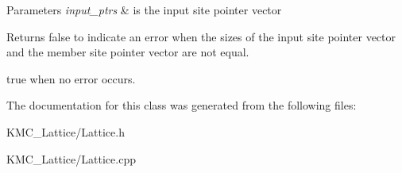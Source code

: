 \begin{DoxyParams}{Parameters}
{\em input\+\_\+ptrs} & is the input site pointer vector \\
\hline
\end{DoxyParams}
\begin{DoxyReturn}{Returns}
false to indicate an error when the sizes of the input site pointer vector and the member site pointer vector are not equal. 

true when no error occurs. 
\end{DoxyReturn}


The documentation for this class was generated from the following files\+:\begin{DoxyCompactItemize}
\item 
K\+M\+C\+\_\+\+Lattice/Lattice.\+h\item 
K\+M\+C\+\_\+\+Lattice/Lattice.\+cpp\end{DoxyCompactItemize}
